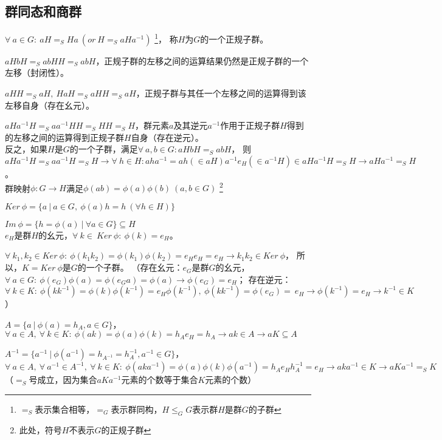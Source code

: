 \subsection{群同态和商群}

$\forall\ a\in G:\ aH=_{S}Ha\ (or\ H=_{S}aHa^{-1})$
\footnote{$=_{S}$表示集合相等，$=_{G}$表示群同构，$H \leq_{G} G$表示群$H$是群$G$的子群}，
称$H$为$G$的一个正规子群。

$aHbH=_{S}abHH=_{S}abH$，正规子群的左移之间的运算结果仍然是正规子群的一个左移（封闭性）。

$aHH=_{S}aH,\ HaH=_{S}aHH=_{S}aH$，正规子群与其任一个左移之间的运算得到该左移自身（存在幺元）。

$aHa^{-1}H=_{S}aa^{-1}HH=_{S}HH=_{S}H$，群元素$a$及其逆元$a^{-1}$作用于正规子群$H$得到的左移之间的运算得到正规子群$H$自身（存在逆元）。
\\

反之，如果$H$是$G$的一个子群，满足$\forall\ a,b\in G:aHbH=_{S}abH$，
则$aHa^{-1}H=_{S}aa^{-1}H=_{S}H
\rightarrow \forall\ h\in H:aha^{-1}=ah(\in aH)a^{-1}e_{H}(\in a^{-1}H)\in aHa^{-1}H=_{S}H
\rightarrow aHa^{-1}=_{S}H$。
\\

群映射$\phi:G\rightarrow H$满足$\phi(ab)=\phi(a)\phi(b)\ (a,b\in G)$
\footnote{此处，符号$H$不表示$G$的正规子群}

$Ker\ \phi=\{a\ |\ a\in G,\ \phi(a)h=h\ (\forall h\in H)\}$

$Im\ \phi=\{h=\phi(a)\ |\ \forall a\in G\}\subseteq H$
\\

$e_{H}$是群$H$的幺元，$\forall\ k\in\ Ker\ \phi:\ \phi(k)=e_{H}$。

$\forall\ k_{1},k_{2}\in Ker\ \phi:\ \phi(k_{1}k_{2})=\phi(k_{1})\phi(k_{2})=e_{H}e_{H}=e_{H}
\rightarrow k_{1}k_{2}\in Ker\ \phi$，
所以，$K=Ker\ \phi$是$G$的一个子群。
（存在幺元：$e_{G}$是群$G$的幺元，
$\forall\ a\in G:\ \phi(e_{G})\phi(a)=\phi(e_{G}a)=\phi(a)\rightarrow \phi(e_{G})=e_{H}$；
存在逆元：$\forall\ k\in K:\ \phi(kk^{-1})=\phi(k)\phi(k^{-1})=e_{H}\phi(k^{-1}),
\ \phi(kk^{-1})=\phi(e_{G})=\ e_{H}
\rightarrow \phi(k^{-1})=e_{H}\rightarrow k^{-1}\in K$）

$A=\{a\ |\ \phi(a)=h_{A}, a\in G\}$，
$\forall\ a\in A,\ \forall\ k\in K:\ \phi(ak)=\phi(a)\phi(k)=h_{A}e_{H}=h_{A}
\rightarrow ak\in A
\rightarrow aK\subseteq A$

$A^{-1}=\{a^{-1}\ |\ \phi(a^{-1})=h_{A^{-1}}=h_{A}^{-1}, a^{-1}\in G\}$，
$\forall\ a\in A,\ \forall\ a^{-1}\in A^{-1},\ \forall\ k\in K:\ \phi(aka^{-1})=\phi(a)\phi(k)\phi(a^{-1})=h_{A}e_{H}h_{A}^{-1}=e_{H}
\rightarrow aka^{-1}\in K
\rightarrow aKa^{-1}=_{S} K$
（$=_{S}$号成立，因为集合$aKa^{-1}$元素的个数等于集合$K$元素的个数）

